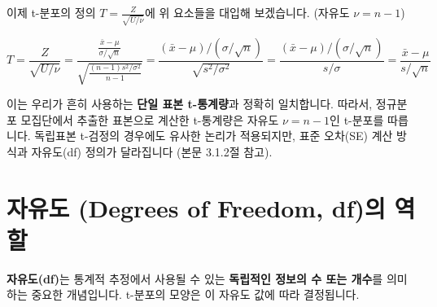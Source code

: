 \documentclass[
  letterpaper,
]{book}
\begin{document}
이제 t-분포의 정의 \(T = \frac{Z}{\sqrt{U/\nu}}\)에 위 요소들을 대입해
보겠습니다. (자유도 \(\nu = n-1\))

\[T = \frac{Z}{\sqrt{U/\nu}} = \frac{\frac{\bar{x} - \mu}{\sigma/\sqrt{n}}}{\sqrt{\frac{(n-1)s^2/\sigma^2}{n-1}}} = \frac{(\bar{x} - \mu)/(\sigma/\sqrt{n})}{\sqrt{s^2/\sigma^2}} = \frac{(\bar{x} - \mu)/(\sigma/\sqrt{n})}{s/\sigma} = \frac{\bar{x} - \mu}{s/\sqrt{n}}\]

이는 우리가 흔히 사용하는 \textbf{단일 표본 t-통계량}과 정확히
일치합니다. 따라서, 정규분포 모집단에서 추출한 표본으로 계산한
t-통계량은 자유도 \(\nu = n-1\)인 t-분포를 따릅니다. 독립표본 t-검정의
경우에도 유사한 논리가 적용되지만, 표준 오차(SE) 계산 방식과 자유도(df)
정의가 달라집니다 (본문 3.1.2절 참고).

\chapter{자유도 (Degrees of Freedom, df)의
역할}\label{uxc790uxc720uxb3c4-degrees-of-freedom-dfuxc758-uxc5eduxd560}

\textbf{자유도(df)}는 통계적 추정에서 사용될 수 있는 \textbf{독립적인
정보의 수 또는 개수}를 의미하는 중요한 개념입니다. t-분포의 모양은 이
자유도 값에 따라 결정됩니다.
\end{document}

